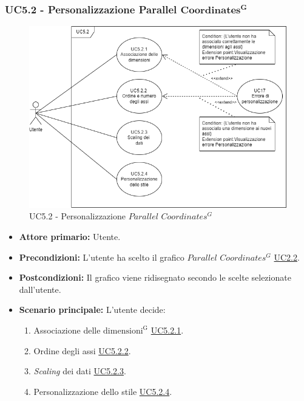 \subsubsection{UC5.2 - Personalizzazione Parallel ${\mathbf{Coordinates^{G}}}$}
\label{sec:UC5.2}
\begin{figure}[h!]
	\centering
	\includegraphics[scale=0.60]{../../assets/personalizzazioneParallelCoordinates.png}
	\caption{UC5.2 - Personalizzazione $Parallel$ $Coordinates^{G}$}
\end{figure}
\begin{itemize}
    \item \textbf{Attore primario:} Utente.
	\item \textbf{Precondizioni:} L'utente ha scelto il grafico $Parallel$ $Coordinates^{G}$ \hyperref[sec:UC2.2]{UC2.2}.
	\item \textbf{Postcondizioni:} Il grafico viene ridisegnato secondo le scelte selezionate dall'utente.
	\item \textbf{Scenario principale:} L'utente decide:
	\begin{enumerate}
        \item Associazione delle ${\mathrm{dimensioni^{G}}}$ \hyperref[sec:UC5.2.1]{UC5.2.1}.
        \item Ordine degli assi \hyperref[sec:UC5.2.2]{UC5.2.2}.
        \item \textit{Scaling} dei dati \hyperref[sec:UC5.2.3]{UC5.2.3}.
        \item Personalizzazione dello stile \hyperref[sec:UC5.2.4]{UC5.2.4}.
    \end{enumerate}
\end{itemize}


